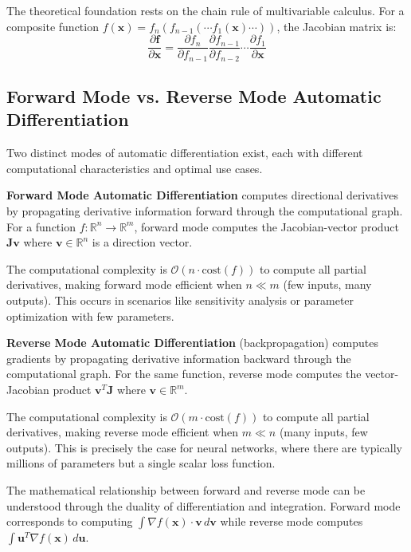 \documentclass[11pt,a4paper]{report}
\begin{document}
The theoretical foundation rests on the chain rule of multivariable calculus. For a composite function $f(\mathbf{x}) = f_n(f_{n-1}(\cdots f_1(\mathbf{x}) \cdots))$, the Jacobian matrix is:
\begin{equation}
\frac{\partial \mathbf{f}}{\partial \mathbf{x}} = \frac{\partial f_n}{\partial f_{n-1}} \frac{\partial f_{n-1}}{\partial f_{n-2}} \cdots \frac{\partial f_1}{\partial \mathbf{x}}
\end{equation}

\subsection{Forward Mode vs. Reverse Mode Automatic Differentiation}

Two distinct modes of automatic differentiation exist, each with different computational characteristics and optimal use cases.

\textbf{Forward Mode Automatic Differentiation} computes directional derivatives by propagating derivative information forward through the computational graph. For a function $f: \mathbb{R}^n \rightarrow \mathbb{R}^m$, forward mode computes the Jacobian-vector product $\mathbf{J}\mathbf{v}$ where $\mathbf{v} \in \mathbb{R}^n$ is a direction vector.

The computational complexity is $\mathcal{O}(n \cdot \text{cost}(f))$ to compute all partial derivatives, making forward mode efficient when $n \ll m$ (few inputs, many outputs). This occurs in scenarios like sensitivity analysis or parameter optimization with few parameters.

\textbf{Reverse Mode Automatic Differentiation} (backpropagation) computes gradients by propagating derivative information backward through the computational graph. For the same function, reverse mode computes the vector-Jacobian product $\mathbf{v}^T\mathbf{J}$ where $\mathbf{v} \in \mathbb{R}^m$.

The computational complexity is $\mathcal{O}(m \cdot \text{cost}(f))$ to compute all partial derivatives, making reverse mode efficient when $m \ll n$ (many inputs, few outputs). This is precisely the case for neural networks, where there are typically millions of parameters but a single scalar loss function.

The mathematical relationship between forward and reverse mode can be understood through the duality of differentiation and integration. Forward mode corresponds to computing $\int \nabla f(\mathbf{x}) \cdot \mathbf{v} \, d\mathbf{v}$ while reverse mode computes $\int \mathbf{u}^T \nabla f(\mathbf{x}) \, d\mathbf{u}$.
\end{document}

